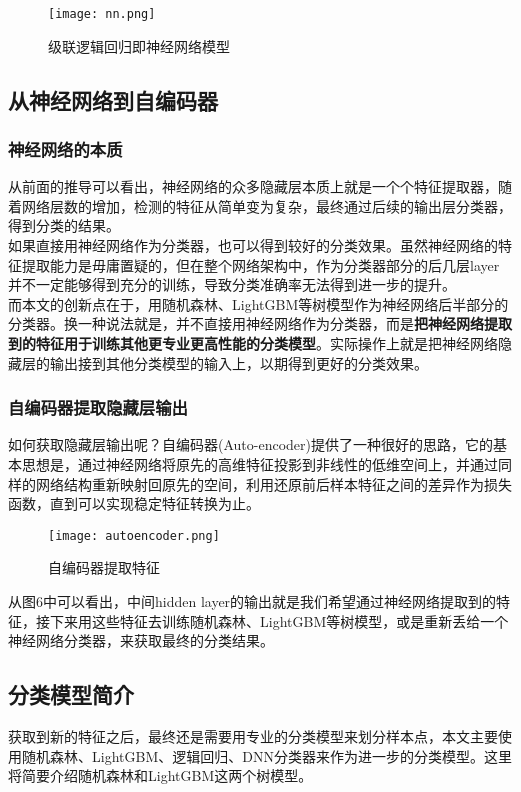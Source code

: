 \begin{figure}[H]
    \centering
    \texttt{[image: nn.png]}
    \caption{级联逻辑回归即神经网络模型}
    \label{fig:nn}
\end{figure}

\subsection{从神经网络到自编码器}
\subsubsection{神经网络的本质}
从前面的推导可以看出，神经网络的众多隐藏层本质上就是一个个特征提取器，随着网络层数的增加，检测的特征从简单变为复杂，最终通过后续的输出层分类器，得到分类的结果。\\

如果直接用神经网络作为分类器，也可以得到较好的分类效果。虽然神经网络的特征提取能力是毋庸置疑的，但在整个网络架构中，作为分类器部分的后几层layer并不一定能够得到充分的训练，导致分类准确率无法得到进一步的提升。\\

而本文的创新点在于，用随机森林、LightGBM等树模型作为神经网络后半部分的分类器。换一种说法就是，并不直接用神经网络作为分类器，而是\textbf{把神经网络提取到的特征用于训练其他更专业更高性能的分类模型}。实际操作上就是把神经网络隐藏层的输出接到其他分类模型的输入上，以期得到更好的分类效果。

\subsubsection{自编码器提取隐藏层输出}
如何获取隐藏层输出呢？自编码器(Auto-encoder)提供了一种很好的思路，它的基本思想是，通过神经网络将原先的高维特征投影到非线性的低维空间上，并通过同样的网络结构重新映射回原先的空间，利用还原前后样本特征之间的差异作为损失函数，直到可以实现稳定特征转换为止。

\begin{figure}[H]
    \centering
    \texttt{[image: autoencoder.png]}
    \caption{自编码器提取特征}
    \label{fig:autoencoder}
\end{figure}

从图6中可以看出，中间hidden layer的输出就是我们希望通过神经网络提取到的特征，接下来用这些特征去训练随机森林、LightGBM等树模型，或是重新丢给一个神经网络分类器，来获取最终的分类结果。

\subsection{分类模型简介}
获取到新的特征之后，最终还是需要用专业的分类模型来划分样本点，本文主要使用随机森林、LightGBM、逻辑回归、DNN分类器来作为进一步的分类模型。这里将简要介绍随机森林和LightGBM这两个树模型。

